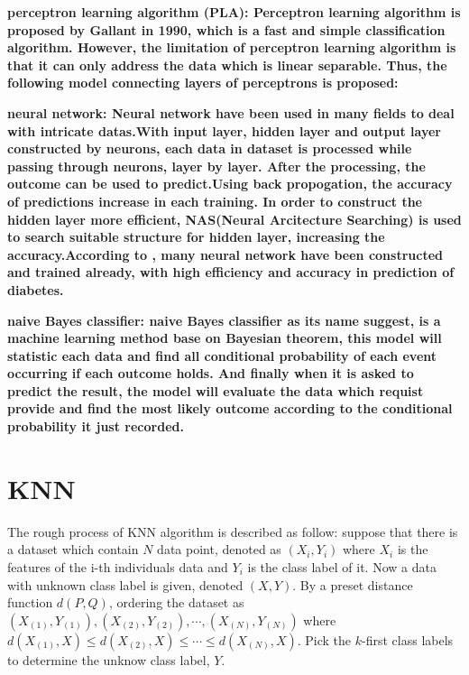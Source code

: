 \documentclass[twocolumn,10pt]{article}
\begin{document}
  \bf{perceptron learning algorithm (PLA)}: \rm{Perceptron} learning algorithm \cite{gallant1990perceptron} is proposed by Gallant 
  in 1990, which is a fast and simple classification algorithm. However, the limitation of perceptron learning algorithm is that it 
  can only address the data which is linear separable. Thus, the following model connecting layers of perceptrons is proposed:

  \bf{neural network}: \rm{Neural} network have been used in many fields to deal with intricate datas.With input layer, hidden 
  layer and output layer constructed by neurons, each data in dataset is processed while passing through neurons, layer by layer. 
  After the processing, the outcome can be used to predict.Using back propogation, the accuracy of predictions increase in each 
  training. In order to construct the hidden layer more efficient, NAS(Neural Arcitecture Searching) is used to search suitable 
  structure for hidden layer, increasing the accuracy.According to \cite{Gadekallu2020}\cite{Beghriche2021}, many neural network 
  have been constructed and trained already, with high efficiency and accuracy in prediction of diabetes.

  \bf{naive Bayes classifier}: \rm{naive Bayes classifier} as its name suggest, is a machine learning method base on Bayesian 
  theorem, this model will statistic each data and find all conditional probability of each event occurring if each outcome holds. 
  And finally when it is asked to predict the result, the model will evaluate the data which requist provide and find the most 
  likely outcome according to the conditional probability it just recorded. 

\section{KNN}
  \rm{The} rough process of KNN algorithm is described as follow: suppose that there is a dataset which contain $N$ data point, denoted as 
  $(X_i,Y_i)$ where $X_i$ is the features of the i-th individuals data and $Y_i$ is the class label of it. Now 
  a data with unknown class label is given, denoted $(X, Y)$. By a preset distance function $d(P, Q)$, ordering the dataset 
  as $(X_{(1)}, Y_{(1)}), (X_{(2)}, Y_{(2)}), \cdots, (X_{(N)}, Y_{(N)})$ where $d(X_{(1)}, X)\leq d(X_{(2)}, X)\leq\cdots\leq d(X_{(N)}, X)$. 
  Pick the $k$-first class labels to determine the unknow class label, $Y$.
\end{document}
